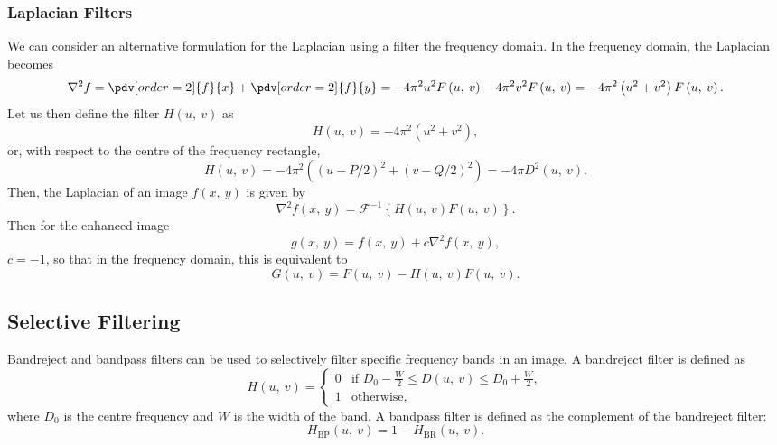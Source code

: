 \documentclass{article}
\begin{document}
\subsubsection{Laplacian Filters}
We can consider an alternative formulation for the Laplacian using a
filter the frequency domain. In the frequency domain, the Laplacian
becomes
\begin{equation*}
    \nabla^2 f = \pdv[order=2]{f}{x} + \pdv[order=2]{f}{y} = -4\pi^2 u^2 F\left( u,\: v \right) - 4\pi^2 v^2 F\left( u,\: v \right) = -4\pi^2 \left( u^2 + v^2 \right) F\left( u,\: v \right).
\end{equation*}
Let us then define the filter \(H\left( u,\: v \right)\) as
\begin{equation*}
    H\left( u,\: v \right) = -4 \pi^2 \left( u^2 + v^2 \right),
\end{equation*}
or, with respect to the centre of the frequency rectangle,
\begin{equation*}
    H\left( u,\: v \right) = -4 \pi^2 \left( \left( u - P/2 \right)^2 + \left( v - Q/2 \right)^2 \right) = -4\pi D^2\left( u,\: v \right).
\end{equation*}
Then, the Laplacian of an image \(f\left( x,\: y \right)\) is given by
\begin{equation*}
    \nabla^2 f\left( x,\: y \right) = \mathscr{F}^{-1}\left\{ H\left( u,\: v \right) F\left( u,\: v \right) \right\}.
\end{equation*}
Then for the enhanced image
\begin{equation*}
    g\left( x,\: y \right) = f\left( x,\: y \right) + c \nabla^2 f\left( x,\: y \right),
\end{equation*}
\(c = -1\), so that in the frequency domain, this is equivalent to
\begin{equation*}
    G\left( u,\: v \right) = F\left( u,\: v \right) - H\left( u,\: v \right) F\left( u,\: v \right).
\end{equation*}
\subsection{Selective Filtering}
Bandreject and bandpass filters can be used to selectively filter
specific frequency bands in an image. A bandreject filter is defined as
\begin{equation*}
    H\left( u,\: v \right) =
    \begin{cases}
        0 & \text{if } D_0 - \frac{W}{2} \leq D\left( u,\: v \right) \leq D_0 + \frac{W}{2}, \\
        1 & \text{otherwise},
    \end{cases}
\end{equation*}
where \(D_0\) is the centre frequency and \(W\) is the width of the
band. A bandpass filter is defined as the complement of the bandreject
filter:
\begin{equation*}
    H_{\text{BP}}\left( u,\: v \right) = 1 - H_{\text{BR}}\left( u,\: v \right).
\end{equation*}
\end{document}
